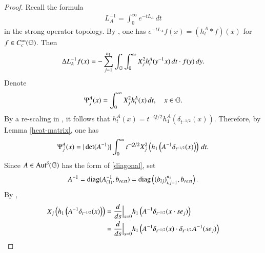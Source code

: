 \documentclass[leqno]{amsart}
\begin{document}
	\begin{proof}
		Recall the formula
		\begin{align*}
			L_{A}^{-1}=\int_{0}^{\infty}e^{-tL_{A}}\,dt
		\end{align*}
		in the strong operator topology.
		By \cite[IV.4]{VSC1992}, one has $e^{-tL_{A}}f(x)=(h_{t}^{A}\ast f)(x)$ for $f\in C_{c}^{\infty}(\mathbb{G})$.
		Then
		\begin{align*}%
			\Delta L_{A}^{-1}f(x)=-\sum_{j=1}^{n_{1}}\int_{\GG}\int_{0}^{\infty}X_{j}^{2}h_{t}^{A}(y\rp x)\,dt\cdot f(y)\,dy.
		\end{align*}
		Denote
		\begin{align*}
			\Psi^{A}_{j}(x)=\int_{0}^{\infty}X_{j}^{2}h_{t}^{A}(x)\,dt,\quad x\in\mathbb{G}.
		\end{align*}
		By a re-scaling in \cite[Proposition (1.68)]{FS1982}, it follows that $h_{t}^{A}(x)=t^{-Q/2}h_{1}^{A}(\delta_{t^{-1/2}}(x))$.
		Therefore, by Lemma \ref{heat-matrix}, one has
		\begin{align}\label{kernel-heat-A}
			\Psi^{A}_{j}(x )=|\det(A^{-1})|
			\int_{0}^{\infty}t^{-Q/2}X_{j}^{2}\left(h_{1}\left(A^{-1}\delta_{t^{-1/2}}(x)\right)\right)\,dt.
		\end{align}
		Since $A\in{\rm Aut^{\delta}}(\mathbb{G})$ has the form of \eqref{diagonal}, set
		\begin{align*}
			A^{-1}={\rm diag}(A_{(1)}^{-1},b_{rest})
			={\rm diag}\left((b_{ij})_{i,j=1}^{n_{1}},b_{rest}\right).
		\end{align*}
		By \cite[Proposition 1.2.16]{BLU2007},
		\begin{align*}
			X_{j}\left(h_{1}\left(A\rp\delta_{t^{-1/2}}(x)\right)\right)
			&=\frac{d}{ds}\Big|_{s=0} h_{1}\left(A\rp\delta_{t^{-1/2}}(x\cdot se_{j})\right)\\
			&=\frac{d}{ds}\Big|_{s=0} h_{1}\left(A\rp\delta_{t^{-1/2}}(x)\cdot \delta_{t^{-1/2}}A\rp(se_{j})\right)\\

\end{align*}
\end{proof}
\end{document}
